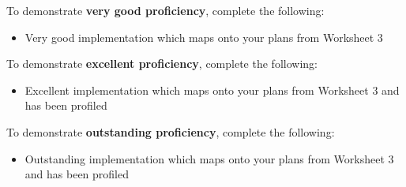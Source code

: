 \documentclass{../../../fal_assignment}
\begin{document}
To demonstrate \textbf{very good proficiency}, complete the following:
\begin{itemize}
	\item Very good implementation which maps onto your plans from Worksheet 3
\end{itemize}

To demonstrate \textbf{excellent proficiency}, complete the following:
\begin{itemize}
	\item Excellent implementation which maps onto your plans from Worksheet 3 and has been profiled
\end{itemize}

To demonstrate \textbf{outstanding proficiency}, complete the following:
\begin{itemize}
	\item Outstanding implementation which maps onto your plans from Worksheet 3 and has been profiled
\end{itemize}
\end{document}
